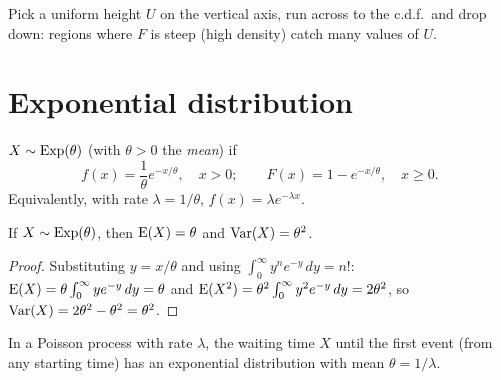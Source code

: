 \begin{center}
\end{center}
Pick a uniform height $U$ on the vertical axis, run across to the c.d.f.\ and drop down:
regions where $F$ is steep (high density) catch many values of $U$.

\section{Exponential distribution}

\begin{definition}[Exponential]
$X\sim\operatorname{Exp}(\theta)$ (with $\theta>0$ the \emph{mean}) if
\[
  f(x) = \frac{1}{\theta}e^{-x/\theta}, \quad x>0; \qquad F(x) = 1 - e^{-x/\theta},
  \quad x\ge 0.
\]
Equivalently, with rate $\lambda = 1/\theta$, $f(x) = \lambda e^{-\lambda x}$.
\end{definition}

\begin{theorem}
If $X\sim\operatorname{Exp}(\theta)$, then $\operatorname{E}(X) = \theta$ and $\operatorname{Var}(X) = \theta^2$.
\end{theorem}

\begin{proof}
Substituting $y = x/\theta$ and using $\int_0^\infty y^n e^{-y}\,dy = n!$:
$\operatorname{E}(X) = \theta\int_0^\infty y e^{-y}\,dy = \theta$ and
$\operatorname{E}(X^2) = \theta^2\int_0^\infty y^2e^{-y}\,dy = 2\theta^2$, so
$\operatorname{Var}(X) = 2\theta^2 - \theta^2 = \theta^2$.
\end{proof}

\begin{theorem}
In a Poisson process with rate $\lambda$, the waiting time $X$ until the first event (from
any starting time) has an exponential distribution with mean $\theta = 1/\lambda$.
\end{theorem}

